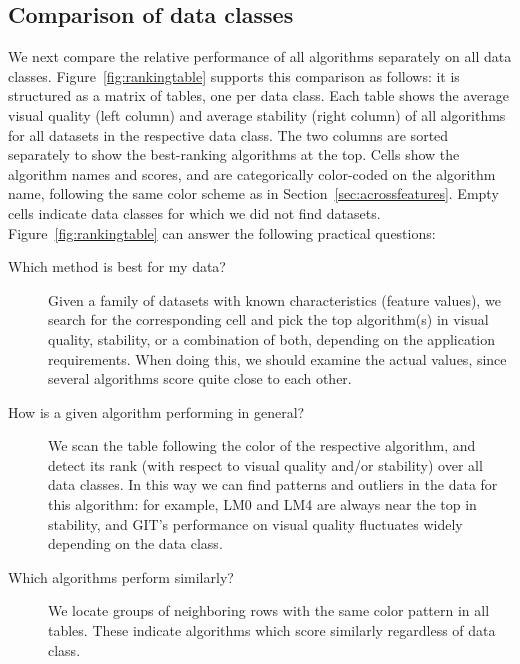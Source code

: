 \subsection{Comparison of data classes}
\label{sec:comparison}
%
We next compare the relative performance of all algorithms separately on all data classes. 
Figure~\ref{fig:rankingtable} supports this comparison as follows: it is structured as a matrix of tables, one per data class.
Each table shows the average visual quality (left column) and average stability (right column) of all algorithms for all datasets in the respective data class. The two columns are sorted separately to show the best-ranking algorithms at the top. Cells show the algorithm names and scores, and are categorically color-coded on the algorithm name, following the same color scheme as in Section~\ref{sec:acrossfeatures}. Empty cells indicate data classes for which we did not find datasets.
Figure~\ref{fig:rankingtable} can answer the following practical questions:
%
\begin{description}
\item[Which method is best for my data?] Given a family of datasets with known characteristics (feature values), we search for the corresponding cell and pick the top algorithm(s) in visual quality, stability, or a combination of both, depending on the application requirements. When doing this, we should examine the actual values, since several algorithms score quite close to each other.
\item[How is a given algorithm performing in general?] We scan the table following the color of the respective algorithm, and detect its rank (with respect to visual quality and/or stability) over all data classes. In this way we can find patterns and outliers in the data for this algorithm: for example, LM0 and LM4 are always near the top in stability, and GIT's performance on visual quality fluctuates widely depending on the data class.
\item[Which algorithms perform similarly?] We locate groups of neigh\-boring rows with the same color pattern in all tables. These indicate algorithms which score similarly regardless of data class.
\end{description}
%

